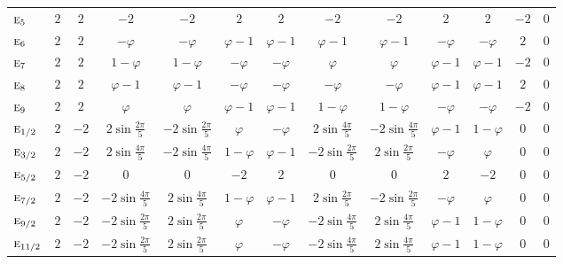 \documentclass[10pt,a4paper]{article}
\makeatletter
\def\grouprule#1#2{\noalign{\marks\LTgroupmarks{\the\belowrulesep}\nobreak\vskip#1%
  \vskip\aboverulesep}\multispan\LT@cols\unskip{\leaders\hrule\@height#2\hfill\kern\z@}\cr
  \noalign{\penalty\LTrulebreak\vskip\belowrulesep\global\@lastruleclass\z@}}
\numberwithin{equation}{section}
\newcommand{\irr}[1]{\text{\normalfont\scshape #1}}
\newcommand{\goldenratio}{\varphi}
\makeatother
\begin{document}
{{\begin{longtable}{@{}lcccccccccccc@{}}
$\irr{e}_{5}$ & $2$ & $2$ & $-2$ & $-2$ & $2$ & $2$ & $-2$ & $-2$ & $2$ & $2$ & $-2$ & $0$\\
$\irr{e}_{6}$ & $2$ & $2$ & $-\goldenratio{}$ & $-\goldenratio{}$ & $\goldenratio - 1$ & $\goldenratio - 1$ & $\goldenratio - 1$ & $\goldenratio - 1$ & $-\goldenratio{}$ & $-\goldenratio{}$ & $2$ & $0$\\
$\irr{e}_{7}$ & $2$ & $2$ & $1 - \goldenratio{}$ & $1 - \goldenratio{}$ & $-\goldenratio{}$ & $-\goldenratio{}$ & $\goldenratio{}$ & $\goldenratio{}$ & $\goldenratio - 1$ & $\goldenratio - 1$ & $-2$ & $0$\\
$\irr{e}_{8}$ & $2$ & $2$ & $\goldenratio - 1$ & $\goldenratio - 1$ & $-\goldenratio{}$ & $-\goldenratio{}$ & $-\goldenratio{}$ & $-\goldenratio{}$ & $\goldenratio - 1$ & $\goldenratio - 1$ & $2$ & $0$\\
$\irr{e}_{9}$ & $2$ & $2$ & $\goldenratio{}$ & $\goldenratio{}$ & $\goldenratio - 1$ & $\goldenratio - 1$ & $1 - \goldenratio{}$ & $1 - \goldenratio{}$ & $-\goldenratio{}$ & $-\goldenratio{}$ & $-2$ & $0$\\
\grouprule{0pt}{\lightrulewidth}
$\irr{e}_{1/2}$ & $2$ & $-2$ & $2\sin\tfrac{2\pi}{5}$ & $-2\sin\tfrac{2\pi}{5}$ & $\goldenratio{}$ & $-\goldenratio{}$ & $2\sin\tfrac{4\pi}{5}$ & $-2\sin\tfrac{4\pi}{5}$ & $\goldenratio - 1$ & $1 - \goldenratio{}$ & $0$ & $0$\\
$\irr{e}_{3/2}$ & $2$ & $-2$ & $2\sin\tfrac{4\pi}{5}$ & $-2\sin\tfrac{4\pi}{5}$ & $1 - \goldenratio{}$ & $\goldenratio - 1$ & $-2\sin\tfrac{2\pi}{5}$ & $2\sin\tfrac{2\pi}{5}$ & $-\goldenratio{}$ & $\goldenratio{}$ & $0$ & $0$\\
$\irr{e}_{5/2}$ & $2$ & $-2$ & $0$ & $0$ & $-2$ & $2$ & $0$ & $0$ & $2$ & $-2$ & $0$ & $0$\\
$\irr{e}_{7/2}$ & $2$ & $-2$ & $-2\sin\tfrac{4\pi}{5}$ & $2\sin\tfrac{4\pi}{5}$ & $1 - \goldenratio{}$ & $\goldenratio - 1$ & $2\sin\tfrac{2\pi}{5}$ & $-2\sin\tfrac{2\pi}{5}$ & $-\goldenratio{}$ & $\goldenratio{}$ & $0$ & $0$\\
$\irr{e}_{9/2}$ & $2$ & $-2$ & $-2\sin\tfrac{2\pi}{5}$ & $2\sin\tfrac{2\pi}{5}$ & $\goldenratio{}$ & $-\goldenratio{}$ & $-2\sin\tfrac{4\pi}{5}$ & $2\sin\tfrac{4\pi}{5}$ & $\goldenratio - 1$ & $1 - \goldenratio{}$ & $0$ & $0$\\
$\irr{e}_{11/2}$ & $2$ & $-2$ & $-2\sin\tfrac{2\pi}{5}$ & $2\sin\tfrac{2\pi}{5}$ & $\goldenratio{}$ & $-\goldenratio{}$ & $-2\sin\tfrac{4\pi}{5}$ & $2\sin\tfrac{4\pi}{5}$ & $\goldenratio - 1$ & $1 - \goldenratio{}$ & $0$ & $0$\\

\end{longtable}}}
\end{document}
